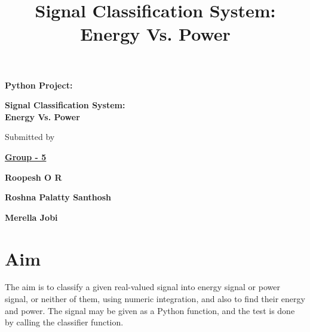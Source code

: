 \documentclass[11pt]{article}
\title{Signal Classification System: Energy Vs. Power}
\begin{document}
	
\begin{titlepage}
	\centering

	{\Large \textbf{Python Project:} \par}
	\vspace{.3cm}
	{\huge \textbf{Signal Classification System:\\ Energy Vs. Power} \par}

	\vspace{1.5cm}
	
	\par
	
	\vspace{1.5cm}
	
	{\large Submitted by \par}
	{\large \textbf{\underline {Group - 5}}\par}
	{\large \textbf{Roopesh O R}\par}
	{\large \textbf{Roshna Palatty Santhosh}\par}
	{\large \textbf{Merella Jobi}\par}


	\vfill

\end{titlepage}


    \maketitle
    
    \section*{Aim}

The aim is to classify a given real-valued signal into energy signal
or power signal, or neither of them, using numeric integration, and also
to find their energy and power. The signal may be given as a Python
function, and the test is done by calling the classifier function.
\end{document}

